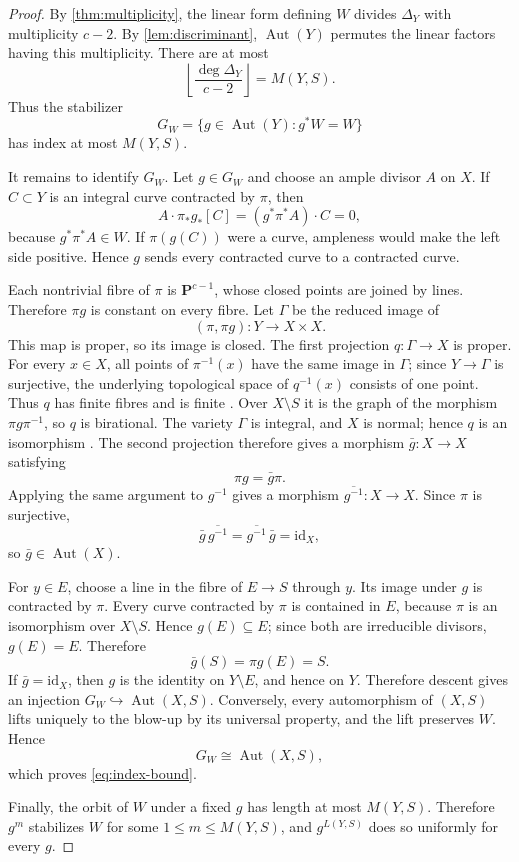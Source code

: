 \documentclass[11pt,reqno]{amsart}
\newcommand{\PP}{\mathbf P}
\DeclareMathOperator{\Aut}{Aut}
\theoremstyle{remark}
\begin{document}
\begin{proof}
By \cref{thm:multiplicity}, the linear form defining $W$ divides $\Delta_Y$ with multiplicity $c-2$.  By \cref{lem:discriminant}, $\Aut(Y)$ permutes the linear factors having this multiplicity.  There are at most
\[
 \left\lfloor\frac{\deg\Delta_Y}{c-2}\right\rfloor
 =M(Y,S).
\]
Thus the stabilizer
\[
 G_W=\{g\in\Aut(Y):g^*W=W\}
\]
has index at most $M(Y,S)$.

It remains to identify $G_W$.  Let $g\in G_W$ and choose an ample divisor $A$ on $X$.  If $C\subset Y$ is an integral curve contracted by $\pi$, then
\[
 A\cdot\pi_*g_*[C]
 =(g^*\pi^*A)\cdot C
 =0,
\]
because $g^*\pi^*A\in W$.  If $\pi(g(C))$ were a curve, ampleness would make the left side positive.  Hence $g$ sends every contracted curve to a contracted curve.

Each nontrivial fibre of $\pi$ is $\PP^{c-1}$, whose closed points are joined by lines.  Therefore $\pi g$ is constant on every fibre.  Let $\Gamma$ be the reduced image of
\[
 (\pi,\pi g)\colon Y\longrightarrow X\times X.
\]
This map is proper, so its image is closed.  The first projection $q\colon\Gamma\to X$ is proper.  For every $x\in X$, all points of $\pi^{-1}(x)$ have the same image in $\Gamma$; since $Y\to\Gamma$ is surjective, the underlying topological space of $q^{-1}(x)$ consists of one point.  Thus $q$ has finite fibres and is finite \cite[Tag~02LS]{Stacks}.  Over $X\setminus S$ it is the graph of the morphism $\pi g\pi^{-1}$, so $q$ is birational.  The variety $\Gamma$ is integral, and $X$ is normal; hence $q$ is an isomorphism \cite[Tag~0AB1]{Stacks}.  The second projection therefore gives a morphism $\bar g\colon X\to X$ satisfying
\[
 \pi g=\bar g\pi.
\]
Applying the same argument to $g^{-1}$ gives a morphism $\overline{g^{-1}}\colon X\to X$.  Since $\pi$ is surjective,
\[
 \bar g\,\overline{g^{-1}}=\overline{g^{-1}}\,\bar g=\mathrm{id}_X,
\]
so $\bar g\in\Aut(X)$.

For $y\in E$, choose a line in the fibre of $E\to S$ through $y$.  Its image under $g$ is contracted by $\pi$.  Every curve contracted by $\pi$ is contained in $E$, because $\pi$ is an isomorphism over $X\setminus S$.  Hence $g(E)\subseteq E$; since both are irreducible divisors, $g(E)=E$.  Therefore
\[
 \bar g(S)=\pi g(E)=S.
\]
If $\bar g=\mathrm{id}_X$, then $g$ is the identity on $Y\setminus E$, and hence on $Y$.  Therefore descent gives an injection $G_W\hookrightarrow\Aut(X,S)$.  Conversely, every automorphism of $(X,S)$ lifts uniquely to the blow-up by its universal property, and the lift preserves $W$.  Hence
\[
 G_W\cong\Aut(X,S),
\]
which proves \eqref{eq:index-bound}.

Finally, the orbit of $W$ under a fixed $g$ has length at most $M(Y,S)$.  Therefore $g^m$ stabilizes $W$ for some $1\le m\le M(Y,S)$, and $g^{L(Y,S)}$ does so uniformly for every $g$.
\end{proof}
\end{document}
